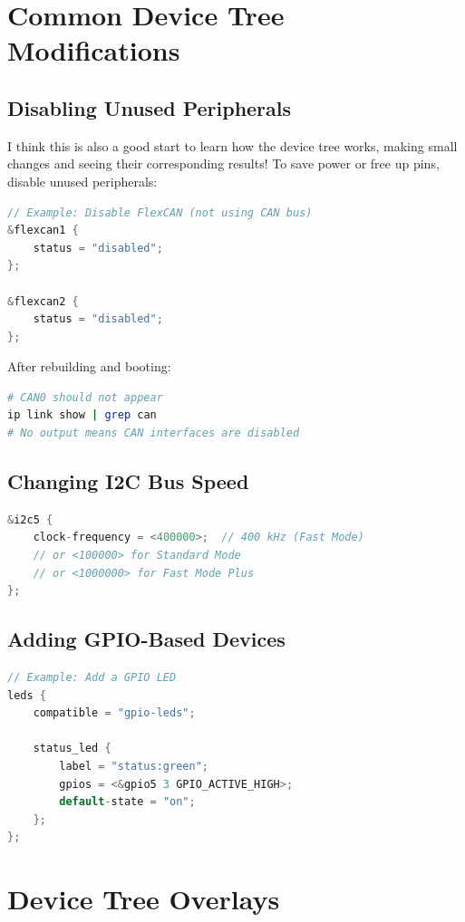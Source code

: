 \documentclass[12pt,a4paper]{report}
\begin{document}
\section{Common Device Tree Modifications}

\subsection{Disabling Unused Peripherals}

I think this is also a good start to learn how the device tree works, making small changes and seeing their corresponding results! To save power or free up pins, disable unused peripherals:

\begin{lstlisting}[language=c]
// Example: Disable FlexCAN (not using CAN bus)
&flexcan1 {
    status = "disabled";
};

&flexcan2 {
    status = "disabled";
};
\end{lstlisting}

After rebuilding and booting:
\begin{lstlisting}[language=bash]
# CAN0 should not appear
ip link show | grep can
# No output means CAN interfaces are disabled
\end{lstlisting}

\subsection{Changing I2C Bus Speed}

\begin{lstlisting}[language=c]
&i2c5 {
    clock-frequency = <400000>;  // 400 kHz (Fast Mode)
    // or <100000> for Standard Mode
    // or <1000000> for Fast Mode Plus
};
\end{lstlisting}

\subsection{Adding GPIO-Based Devices}

\begin{lstlisting}[language=c]
// Example: Add a GPIO LED
leds {
    compatible = "gpio-leds";
    
    status_led {
        label = "status:green";
        gpios = <&gpio5 3 GPIO_ACTIVE_HIGH>;
        default-state = "on";
    };
};
\end{lstlisting}


\section{Device Tree Overlays}
\end{document}
